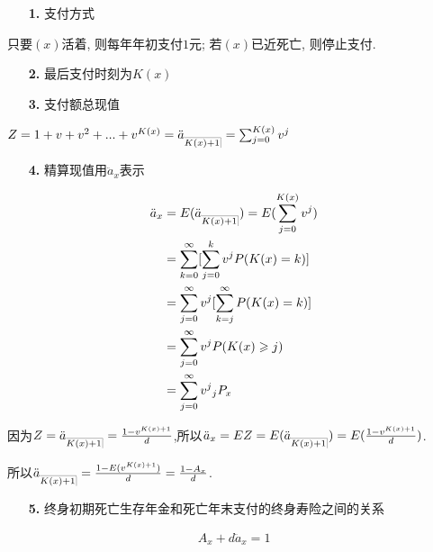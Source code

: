 \documentclass[a4paper,10pt]{ctexbook}
\makeatletter
\newcommand{\hei}{\CJKfamily{hei}}      %
\DeclareRobustCommand{\annu}[1]{_{%
    \def\arraystretch{0}%
    \setlength\arraycolsep{1pt}%
    \setlength\arrayrulewidth{.2pt}%
    \begin{array}[b]{@{}c|}\hline
        \\[\arraycolsep]%
        \scriptstyle #1%
    \end{array}%
}}
\makeatother
\begin{document}
\begin{itemize}
    \item[{\bf\hei 1.}]支付方式
\end{itemize}

只要$(x)$活着, 则每年年初支付$1$元; 若$(x)$已近死亡, 则停止支付.

\begin{itemize}
    \item[{\bf\hei 2.}]最后支付时刻为$K(x)$
\end{itemize}

\begin{itemize}
    \item[{\bf\hei 3.}]支付额总现值
\end{itemize}

$Z=1+v+v^2+...+v^{K(x)}=\ddot a_{\annu {K(x)+1}}=\sum_{j=0}^{K\left( x \right)}{v^j}$

\begin{itemize}
    \item[{\bf\hei 4.}]精算现值用$\ddot a_x$表示
\end{itemize}

\begin{align*}
    \ddot a_x & =E(\ddot a_{\annu {K(x)+1}})=E(\sum_{j=0}^{K\left( x \right)}{v^j}) \\
              & = \sum_{k=0}^{\infty}[\sum_{j=0}^{k}{v^j}P(K(x) = k)]               \\
              & = \sum_{j=0}^{\infty}v^j[\sum_{k=j}^{\infty}P(K(x) = k)]            \\
              & =\sum_{j=0}^{\infty}{v^j}P(K(x) \geqslant j)                        \\
              & =\sum_{j=0}^{\infty}{v^j}{}_j P_x                                   \\
\end{align*}

因为$Z=\ddot a_{\annu {K(x)+1}}=\frac{1-v^{K(x)+1}}{d}$,所以$\ddot a_x=EZ=E(\ddot a_{\annu {K(x)+1}})=E(\frac{1-v^{K(x)+1}}{d})$.

所以$\ddot a_{\annu {K(x)+1}}=\frac{1-E(v^{K(x)+1})}{d}=\frac{1-A_x}{d}$.

\begin{itemize}
    \item[{\bf\hei 5.}]终身初期死亡生存年金和死亡年末支付的终身寿险之间的关系
\end{itemize}

\begin{align*}
    A_x+d \ddot a_x=1
\end{align*}
\end{document}
